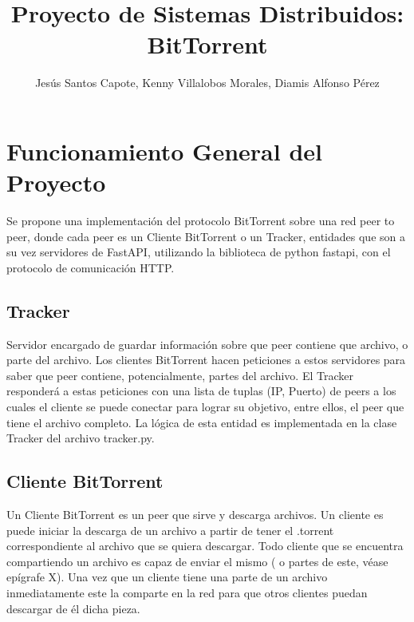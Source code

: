 \documentclass[article]{llncs}
\begin{document}
%
\title{Proyecto de Sistemas Distribuidos: BitTorrent}
%
%
\author{Jes\'us Santos Capote, Kenny Villalobos Morales, Diamis Alfonso P\'erez}
%
%
\maketitle              %
%

\section{Funcionamiento General del Proyecto}
Se propone una implementación del protocolo BitTorrent sobre una red peer to peer, donde cada peer es un 
Cliente BitTorrent o un Tracker, entidades que son a su vez servidores de FastAPI, utilizando la biblioteca de python fastapi, 
con el protocolo de comunicación HTTP.

\subsection{Tracker}
Servidor encargado de guardar información sobre que peer contiene que archivo, o parte del archivo. Los clientes 
BitTorrent hacen peticiones a estos servidores para saber que peer contiene, potencialmente, partes del archivo. El Tracker
responderá a estas peticiones con una lista de tuplas (IP, Puerto) de peers a los cuales el cliente se puede conectar para 
lograr su objetivo, entre ellos, el peer que tiene el archivo completo. La lógica de esta entidad es implementada en la clase 
Tracker del archivo tracker.py.

\subsection{Cliente BitTorrent}
Un Cliente BitTorrent es un peer que sirve y descarga archivos. Un cliente es puede iniciar la descarga de un archivo a partir de tener
el .torrent correspondiente al archivo que se quiera descargar. Todo cliente que se encuentra compartiendo un archivo es capaz de
enviar el mismo ( o partes de este, véase epígrafe X). Una vez que un cliente tiene una parte de un archivo inmediatamente 
este la comparte en la red para que otros clientes puedan descargar de él dicha pieza.
\end{document}
